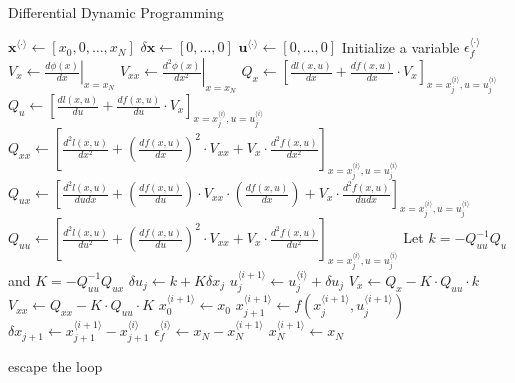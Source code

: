 \documentclass{article}
\begin{document}
\begin{algorithm}[t]
\caption{Differential Dynamic Programming}\label{DDP}
\renewcommand{\algorithmicrequire}{\textbf{Input:}}
\begin{algorithmic}[1]
\State $\mathbf{x}^{\langle \cdot \rangle}\leftarrow [x_0,0,\ldots,x_N]$
\State $\delta\mathbf{x}\leftarrow [0,\ldots,0]$
\State $\mathbf{u}^{\langle \cdot \rangle}\leftarrow [0,\ldots,0]$
\State Initialize a variable $\epsilon_f^{\langle \cdot \rangle}$
\textcolor{gray}{}
\State $V_x \leftarrow \left.\frac{d\phi(x)}{dx}\right|_{x=x_N}$
\State $V_{xx} \leftarrow \left.\frac{d^2\phi(x)}{dx^2}\right|_{x=x_N}$
 \textcolor{gray}{}
\State $Q_x \leftarrow \left[\frac{dl(x,u)}{dx}+\frac{df(x,u)}{dx}\cdot V_x\right]_{x=x_j^{\langle i \rangle},u=u_j^{\langle i \rangle}}$
\State $Q_u \leftarrow \left[\frac{dl(x,u)}{du}+\frac{df(x,u)}{du}\cdot V_x\right]_{x=x_j^{\langle i \rangle},u=u_j^{\langle i \rangle}}$
\State $Q_{xx} \leftarrow \left[\frac{d^2l(x,u)}{dx^2}+\left(\frac{df(x,u)}{dx}\right)^2\cdot V_{xx} + V_x \cdot \frac{d^2f(x,u)}{dx^2}\right]_{x=x_j^{\langle i \rangle},u=u_j^{\langle i \rangle}}$
\State $Q_{ux} \leftarrow \left[\frac{d^2l(x,u)}{dudx}+\left(\frac{df(x,u)}{du}\right)\cdot V_{xx} \cdot \left(\frac{df(x,u)}{dx}\right) + V_x \cdot \frac{d^2f(x,u)}{dudx}\right]_{x=x_j^{\langle i \rangle},u=u_j^{\langle i \rangle}}$
\State $Q_{uu} \leftarrow \left[\frac{d^2l(x,u)}{du^2}+\left(\frac{df(x,u)}{du}\right)^2\cdot V_{xx} + V_x \cdot \frac{d^2f(x,u)}{du^2}\right]_{x=x_j^{\langle i \rangle},u=u_j^{\langle i \rangle}}$
\State Let $k=-Q_{uu}^{-1}Q_{u}$ and $K=-Q_{uu}^{-1}Q_{ux}$
\State $\delta u_j \leftarrow k+K\delta x_j$\textcolor{gray}{}
\State $ u_j^{\langle i+1\rangle} \leftarrow u_j^{\langle i\rangle} + \delta u_j$
\State $V_x \leftarrow Q_x-K\cdot Q_{uu}\cdot k$\textcolor{gray}{}
\State $V_{xx} \leftarrow Q_{xx}-K\cdot Q_{uu}\cdot K$
\EndFor
\State $x_0^{\langle i+1 \rangle} \leftarrow x_0$
\textcolor{gray}{}
\State $x_{j+1}^{\langle i+1 \rangle} \leftarrow f(x_j^{\langle i+1 \rangle},u_j^{\langle i+1 \rangle})$
\State $\delta x_{j+1} \leftarrow x_{j+1}^{\langle i+1 \rangle} - x_{j+1}^{\langle i \rangle}$
\EndFor
\State $\epsilon_f^{\langle i \rangle} \leftarrow x_N - x_N^{\langle i+1 \rangle}$
\State $x_N^{\langle i+1 \rangle} \leftarrow x_N$

escape the loop
\EndIf
\EndFor
\end{algorithmic}
\end{algorithm}
\end{document}
